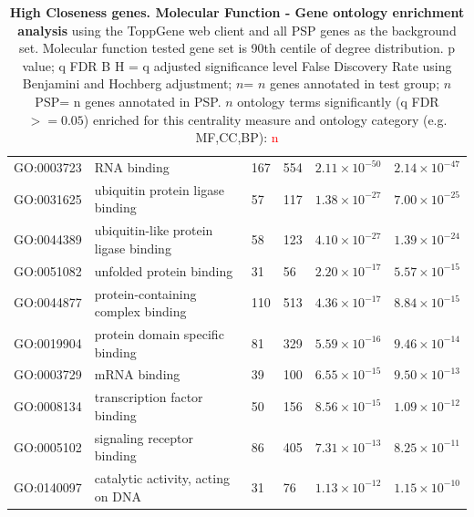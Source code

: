\begin{table}[ht]
\begin{adjustbox}{width=\textwidth}
\begin{tabular}{@{}clllcl@{}}
  \midrule
GO:0003723 & RNA binding & 167 & 554 & $2.11 \times 10^{-50}$ & $2.14 \times 10^{-47}$ \\ 
  GO:0031625 & ubiquitin protein ligase binding & 57 & 117 & $1.38 \times 10^{-27}$ & $7.00 \times 10^{-25}$ \\ 
  GO:0044389 & ubiquitin-like protein ligase binding & 58 & 123 & $4.10 \times 10^{-27}$ & $1.39 \times 10^{-24}$ \\ 
  GO:0051082 & unfolded protein binding & 31 & 56 & $2.20 \times 10^{-17}$ & $5.57 \times 10^{-15}$ \\ 
  GO:0044877 & protein-containing complex binding & 110 & 513 & $4.36 \times 10^{-17}$ & $8.84 \times 10^{-15}$ \\ 
  GO:0019904 & protein domain specific binding & 81 & 329 & $5.59 \times 10^{-16}$ & $9.46 \times 10^{-14}$ \\ 
  GO:0003729 & mRNA binding & 39 & 100 & $6.55 \times 10^{-15}$ & $9.50 \times 10^{-13}$ \\ 
  GO:0008134 & transcription factor binding & 50 & 156 & $8.56 \times 10^{-15}$ & $1.09 \times 10^{-12}$ \\ 
  GO:0005102 & signaling receptor binding & 86 & 405 & $7.31 \times 10^{-13}$ & $8.25 \times 10^{-11}$ \\ 
  GO:0140097 & catalytic activity, acting on DNA & 31 & 76 & $1.13 \times 10^{-12}$ & $1.15 \times 10^{-10}$ \\ 
   \bottomrule
\end{tabular}
\end{adjustbox}
\caption[Gene ontology enrichment High Closeness genes Molecular Function of genes above 90th centile of distribution]{\textbf{High Closeness genes. Molecular Function - Gene ontology enrichment analysis} using the ToppGene web client and all PSP genes as the background set.  Molecular function tested gene set is 90th centile of degree distribution.  p value; q FDR B H = q adjusted significance level False Discovery Rate using Benjamini and Hochberg adjustment; $n$= $n$ genes annotated in test group; $n$ PSP= n genes annotated in PSP. $n$ ontology terms significantly (q FDR$>=0.05$) enriched for this centrality measure and ontology category (e.g. MF,CC,BP): \textcolor{red}{n}} 
\label{tab:ToppGENE GO: Molecular Function. clo 90 centile cwpsp.txtp = p value; q FDR B H = q adjusted significance level False Discovery Rate using Benjamini and Hochberg adjustment; n= n genes annotated in test group; n PSP= n genes annotated in PSP}
\end{table}

